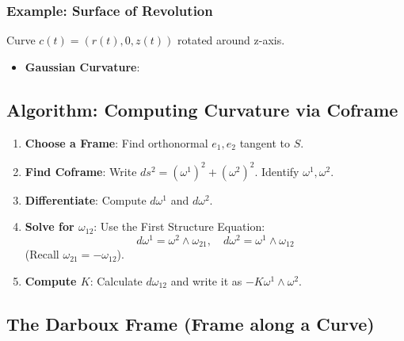 \documentclass[a4paper,12pt]{article}
\newcommand{\formula}[1]{\textcolor{formulacolor}{\bfseries\boldmath{#1}}}
\begin{document}
\subsubsection{Example: Surface of Revolution}
Curve $c(t) = (r(t), 0, z(t))$ rotated around z-axis.
\begin{itemize}
    \item \textbf{Gaussian Curvature}: \formula{$K = -\frac{r''(t)}{r(t)}$} \quad {}
\end{itemize}


\subsection{Algorithm: Computing Curvature via Coframe}

\begin{enumerate}
    \item \textbf{Choose a Frame}: Find orthonormal $e_1, e_2$ tangent to $S$.
    \item \textbf{Find Coframe}: Write $ds^2 = (\omega^1)^2 + (\omega^2)^2$. Identify $\omega^1, \omega^2$.
    \item \textbf{Differentiate}: Compute $d\omega^1$ and $d\omega^2$.
    \item \textbf{Solve for $\omega_{12}$}: Use the First Structure Equation:
    \begin{equation*}
        d\omega^1 = \omega^2 \wedge \omega_{21}, \quad d\omega^2 = \omega^1 \wedge \omega_{12}
    \end{equation*}
    (Recall $\omega_{21} = -\omega_{12}$).
    \item \textbf{Compute $K$}: Calculate $d\omega_{12}$ and write it as $-K \omega^1 \wedge \omega^2$.
\end{enumerate}


\subsection{The Darboux Frame (Frame along a Curve)}
\end{document}
